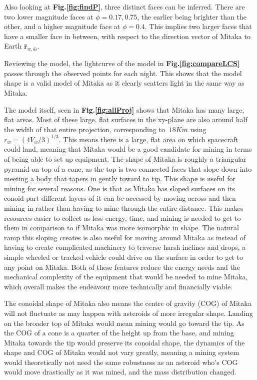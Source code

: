 \documentclass[10pt,twocolumn]{revtex4}    %
\newcommand*{\earth}{{\oplus}}
\newcommand{\reffig}[1]{\textbf{Fig.#1}}
\begin{document}
Also looking at \reffig{\ref{fig:findP}}, three distinct faces can be inferred. There are two lower magnitude faces at $\phi = 0.17, 0.75$, the earlier being brighter than the other, and a higher magnitude face at $\phi = 0.4$. This implies two larger faces that have a smaller face in between, with respect to the direction vector of Mitaka to Earth $\hat{\textbf{r}}_{w,\earth}$. 

Reviewing the model, the lightcurve of the model in \reffig{\ref{fig:compareLCS}} passes through the observed points for each night. This shows that the model shape is a valid model of Mitaka as it clearly scatters light in the same way as Mitaka. 

The model itself, seen in \reffig{\ref{fig:allProj}} shows that Mitaka has many large, flat areas. Most of these large, flat surfaces in the xy-plane are also around half the width of that entire projection, corresponding to $~18Km$ using $r_w = (4V_w/3)^{1/3}$. This means there is a large, flat area on which spacecraft could land, meaning that Mitaka would be a good candidate for mining in terms of being able to set up equipment.  
The shape of Mitaka is roughly a triangular pyramid on top of a cone, as the top is two connected faces that slope down into meeting a body that tapers in gently toward to tip. This shape is useful for mining for several reasons. 
One is that as Mitaka has sloped surfaces on its conoid part different layers of it can be accessed by moving across and then mining in rather than having to mine through the entire distance. This makes resources easier to collect as less energy, time, and mining is needed to get to them in comparison to if Mitaka was more isomorphic in shape.
The natural ramp this sloping creates is also useful for moving around Mitaka as instead of having to create complicated machinery to traverse harsh inclines and drops, a simple wheeled or tracked vehicle could drive on the surface in order to get to any point on Mitaka. 
Both of these features reduce the energy needs and the mechanical complexity of the equipment that would be needed to mine Mitaka, which overall makes the endeavour more technically and financially viable. 

The conoidal shape of Mitaka also means the centre of gravity (COG) of Mitaka will not fluctuate as may happen with asteroids of more irregular shape. Landing on the broader top of Mitaka would mean mining would go toward the tip. As the COG of a cone is a quarter of the height up from the base, and mining Mitaka towards the tip would preserve its conoidal shape, the dynamics of the shape and COG of Mitaka would not vary greatly, meaning a mining system would theoretically not need the same robustness as an asteroid who's COG would move drastically as it was mined, and the mass distribution changed. 
\end{document}
